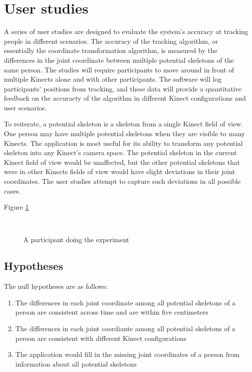 \documentclass{sigchi}
\begin{document}
\section{User studies}

A series of user studies are designed to evaluate the system's accuracy at tracking people in different scenarios. The accuracy of the tracking algorithm, or essentially the coordinate transformation algorithm, is measured by the differences in the joint coordinate between multiple potential skeletons of the same person. The studies will require participants to move around in front of multiple Kinects alone and with other participants. The software will log participants' positions from tracking, and these data will provide a quantitative feedback on the accuracty of the algorithm in different Kinect configurations and user scenarios.

To reiterate, a potential skeleton is a skeleton from a single Kinect field of view. One person may have multiple potential skeletons when they are visible to many Kinects. The application is most useful for its ability to transform any potential skeleton into any Kinect's camera space. The potential skeleton in the current Kinect field of view would be unaffected, but the other potential skeletons that were in other Kinects fields of view would have slight deviations in their joint coordinates. The user studies attempt to capture such deviations in all possible cases.

Figure \ref{fig:studies_example}

\begin{figure}[!h]
  \centering
  
  \caption{A participant doing the experiment}~\label{fig:studies_example}
\end{figure}

\subsection{Hypotheses}

The null hypotheses are as follows:

\begin{enumerate}
  \item The differences in each joint coordinate among all potential skeletons of a person are consistent across time and are within five centimeters
  \item The differences in each joint coordiante among all potential skeletons of a person are consistent with different Kinect configurations
  \item The application would fill in the missing joint coordinates of a person from information about all potential skeletons
\end{enumerate}
\end{document}
